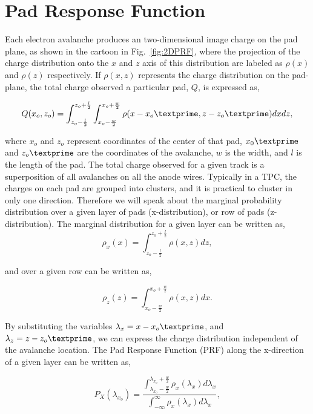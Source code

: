 
\section{Pad Response Function}
\label{sec:prf}
Each electron avalanche produces an two-dimensional image charge on the pad plane, as shown in the cartoon in Fig.~\ref{fig:2DPRF}, where the projection of the charge distribution onto the $x$ and $z$ axis of this distribution are labeled as $\rho(x)$ and $\rho(z)$ respectively. If $\rho(x,z)$ represents the charge distribution on the pad-plane, the total charge observed a particular pad, $Q$, is expressed as,

\begin{equation}
Q(x_o,z_o) = \int_{z_o - \frac{l}{2}}^{z_o + \frac{l}{2}} \int_{x_o - \frac{w}{2}}^{x_o + \frac{w}{2}} \rho(x-x_o\textprime,z - z_o\textprime) dxdz,
\label{eq:prfpadCharge}
\end{equation}

where $x_o$ and $z_o$ represent coordinates of the center of that pad, $x_0\textprime$ and $z_o\textprime$ are the coordinates of the avalanche, $w$ is the width, and $l$ is the length of the pad. The total charge observed for a given track is a superposition of all avalanches on all the anode wires. Typically in a TPC, the charges on each pad are grouped into clusters, and it is practical to cluster in only one direction. Therefore we will speak about the marginal probability distribution over a given layer of pads (x-distribution), or row of pads (z-distribution). The marginal distribution for a given layer can be written as,
\begin{equation}
\rho_x(x) = \int_{z_o - \frac{l}{2}}^{z_o + \frac{l}{2}} \rho(x,z)dz,
\end{equation}

and over a given row can be written as,

\begin{equation}
\rho_z(z) = \int_{x_o - \frac{w}{2}}^{x_o + \frac{w}{2}} \rho(x,z)dx.
\end{equation}

By substituting the variables  $\lambda_x = x - x_o\textprime$, and $\lambda_z = z - z_o\textprime$, we can express the charge distribution independent of the avalanche location. The Pad Response Function (PRF) along the x-direction of a given layer can be written as,

\begin{equation}
P_X(\lambda_{x_o}) = \frac{ \int_{\lambda_{x_o}-\frac{w}{2}}^{\lambda_{x_o} + \frac{w}{2}} \rho_x(\lambda_x)d\lambda_x } {\int_{-\infty}^\infty \rho_x(\lambda_x)d\lambda_x     },
\label{eq:prflayer}
\end{equation}

